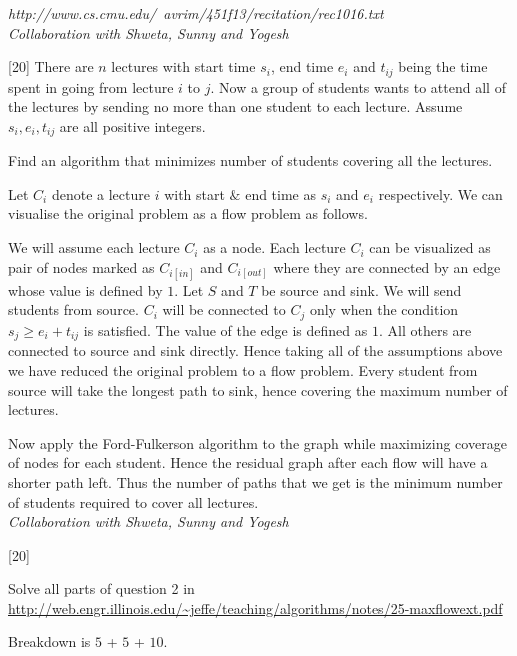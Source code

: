 \documentclass[addpoints]{exam}
\begin{document}
\begin{questions}
\begin{solution}
\emph{http://www.cs.cmu.edu/~avrim/451f13/recitation/rec1016.txt}\\
\emph{Collaboration with Shweta, Sunny and Yogesh}
\end{solution}

[20]
There are $n$ lectures with start time $s_{i}$, end time $e_{i}$
and $t_{ij}$ being the time spent in going from lecture $i$ to $j$.
Now a group of students wants to attend all of the lectures by
sending no more than one student to each lecture. Assume $s_{i}, e_{i},
t_{ij}$ are all positive integers.

Find an algorithm that minimizes number of students covering all the
lectures.
\begin{solution}
Let $C_i$ denote a lecture $i$ with start $\&$ end time as $s_{i}$ and $e_{i}$ respectively. We can visualise the original problem as a flow problem as follows. 

We will assume each lecture $C_i$ as a node. Each lecture $C_i$ can be visualized as pair of nodes marked as $C_{i[in]}$ and $C_{i[out]}$ where they are connected by an edge whose value is defined by $1$. Let $S$ and $T$ be source and sink. We will send students from source. $C_i$ will be connected to $C_j$ only when the condition $s_j \geq e_i + t_{ij}$ is satisfied. The value of the edge is defined as $1$. All others are connected to source and sink directly. Hence taking all of the assumptions above we have reduced the original problem to a flow problem. Every student from source will take the longest path to sink, hence covering the maximum number of lectures.

Now apply the Ford-Fulkerson algorithm to the graph while maximizing coverage of nodes for each student. Hence the residual graph after each flow will have a shorter path left. Thus the number of paths that we get is the minimum number of students required to cover all lectures.\\

\emph{Collaboration with Shweta, Sunny and Yogesh}
\end{solution}


[20]

Solve all parts of question 2 in
\url{http://web.engr.illinois.edu/~jeffe/teaching/algorithms/notes/25-maxflowext.pdf}

Breakdown is $5$ + $5$ + $10$.


\end{questions}
\end{document}
